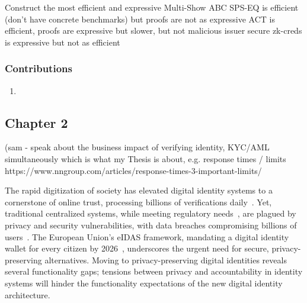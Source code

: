 Construct the most efficient and expressive Multi-Show ABC
SPS-EQ is efficient (don't have concrete benchmarks) but proofs are not as expressive
ACT is efficient, proofs are expressive but slower, but not malicious issuer secure
zk-creds is expressive but not as efficient


\subsubsection{Contributions}
\begin{enumerate}
    \item 
\end{enumerate}









\subsection{Chapter 2}






























(sam - speak about the business impact of verifying identity, KYC/AML simultaneously which is what my Thesis is about, e.g. response times / limits https://www.nngroup.com/articles/response-times-3-important-limits/ 



The rapid digitization of society has elevated digital identity systems to a cornerstone of online trust, processing billions of verifications daily~\cite{noauthor_happy_2021, pang_zanzibar_2019}. Yet, traditional centralized systems, while meeting regulatory needs~\cite{eltayeb_crucial_2024}, are plagued by privacy and security vulnerabilities, with data breaches compromising billions of users~\cite{zhang_data_2022}. The European Union’s eIDAS framework, mandating a digital identity wallet for every citizen by 2026~\cite{noauthor_regulation_2024}, underscores the urgent need for secure, privacy-preserving alternatives. Moving to privacy-preserving digital identities reveals several functionality gaps; tensions between privacy and accountability in identity systems will hinder the functionality expectations of the new digital identity architecture. 

